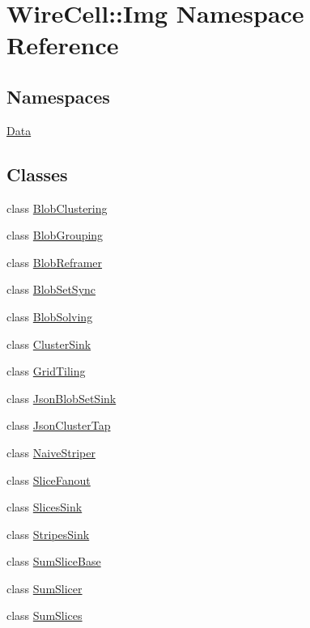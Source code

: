 \hypertarget{namespace_wire_cell_1_1_img}{}\section{Wire\+Cell\+:\+:Img Namespace Reference}
\label{namespace_wire_cell_1_1_img}
\subsection*{Namespaces}
\begin{DoxyCompactItemize}
\item 
 \hyperlink{namespace_wire_cell_1_1_img_1_1_data}{Data}
\end{DoxyCompactItemize}
\subsection*{Classes}
\begin{DoxyCompactItemize}
\item 
class \hyperlink{class_wire_cell_1_1_img_1_1_blob_clustering}{Blob\+Clustering}
\item 
class \hyperlink{class_wire_cell_1_1_img_1_1_blob_grouping}{Blob\+Grouping}
\item 
class \hyperlink{class_wire_cell_1_1_img_1_1_blob_reframer}{Blob\+Reframer}
\item 
class \hyperlink{class_wire_cell_1_1_img_1_1_blob_set_sync}{Blob\+Set\+Sync}
\item 
class \hyperlink{class_wire_cell_1_1_img_1_1_blob_solving}{Blob\+Solving}
\item 
class \hyperlink{class_wire_cell_1_1_img_1_1_cluster_sink}{Cluster\+Sink}
\item 
class \hyperlink{class_wire_cell_1_1_img_1_1_grid_tiling}{Grid\+Tiling}
\item 
class \hyperlink{class_wire_cell_1_1_img_1_1_json_blob_set_sink}{Json\+Blob\+Set\+Sink}
\item 
class \hyperlink{class_wire_cell_1_1_img_1_1_json_cluster_tap}{Json\+Cluster\+Tap}
\item 
class \hyperlink{class_wire_cell_1_1_img_1_1_naive_striper}{Naive\+Striper}
\item 
class \hyperlink{class_wire_cell_1_1_img_1_1_slice_fanout}{Slice\+Fanout}
\item 
class \hyperlink{class_wire_cell_1_1_img_1_1_slices_sink}{Slices\+Sink}
\item 
class \hyperlink{class_wire_cell_1_1_img_1_1_stripes_sink}{Stripes\+Sink}
\item 
class \hyperlink{class_wire_cell_1_1_img_1_1_sum_slice_base}{Sum\+Slice\+Base}
\item 
class \hyperlink{class_wire_cell_1_1_img_1_1_sum_slicer}{Sum\+Slicer}
\item 
class \hyperlink{class_wire_cell_1_1_img_1_1_sum_slices}{Sum\+Slices}
\end{DoxyCompactItemize}
